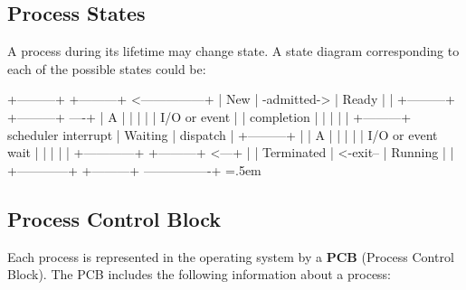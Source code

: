 \documentclass{article}
\newenvironment{cverbatim}
 {\SaveVerbatim{cverb}}
 {\endSaveVerbatim
  \flushleft\fboxrule=0pt\fboxsep=.5em
  \colorbox{cverbbg}{\BUseVerbatim{cverb}}%
  \endflushleft
}
\begin{document}
\subsection{Process States}
A process during its lifetime may change state. A state diagram corresponding to each of the possible states could be:

\begin{cverbatim}
  +---------+             +---------+ <---------------+
  |   New   | -admitted-> |  Ready  |                 |
  +---------+             +---------+ ----+           |
                               A          |           |
                               |          |           |
                          I/O or event    |           |
                           completion     |           |
                               |          |           |
                          +---------+    scheduler   interrupt
                          | Waiting |    dispatch     |
                          +---------+     |           |
                               A          |           |
                               |          |           |
                       I/O or event wait  |           |
                               |          |           |
  +------------+          +---------+ <---+           |
  | Terminated | <-exit-- | Running |                 |
  +------------+          +---------+ ----------------+ 
\end{cverbatim}

\subsection{Process Control Block}
Each process is represented in the operating system by a \textbf{PCB} (Process Control Block). The PCB includes the following information about a process:
\end{document}
